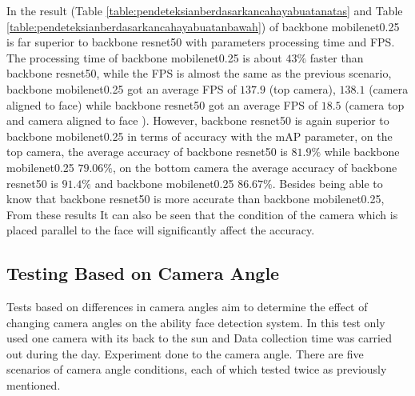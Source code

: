 In the result (Table \ref{table:pendeteksianberdasarkancahayabuatanatas} and Table \ref{table:pendeteksianberdasarkancahayabuatanbawah}) of backbone mobilenet0.25 is far superior to backbone resnet50 with parameters
processing time and FPS. The processing time of backbone mobilenet0.25 is about $43\%$ faster than backbone resnet50, while the FPS is almost the same as the previous scenario, 
backbone mobilenet0.25 got an average FPS of $137.9$ (top camera), 
$138.1$ (camera aligned to face) while backbone resnet50 
got an average FPS of $18.5$ (camera top and camera aligned to face ). However, backbone resnet50 
is again superior to backbone mobilenet0.25
in terms of accuracy with the mAP parameter, on the top camera, 
the average accuracy of backbone resnet50 is $81.9\%$ while backbone mobilenet0.25 $79.06\%$, on the bottom camera
the average accuracy of backbone resnet50 is $91.4\%$ and backbone mobilenet0.25 $86.67\%$. Besides being able to know that backbone resnet50 
is more accurate than backbone mobilenet0.25, From these results
It can also be seen that the condition of the camera which is placed parallel to the face will significantly affect the accuracy.

\subsection{Testing Based on Camera Angle}

Tests based on differences in camera angles aim to
determine the effect of changing camera angles on the ability
face detection system. In this test only used
one camera with its back to the sun and
Data collection time was carried out during the day. Experiment done
to the camera angle. There are five scenarios of camera angle conditions, each of which
tested twice as previously mentioned.

